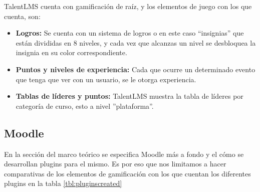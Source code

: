 \begin{multicols*}{2}
    \noindent TalentLMS cuenta con gamificación de raíz,
    y los elementos de juego con los que cuenta, son:
    
    \begin{itemize} 
    
        \item {\bf Logros:} Se cuenta con un sistema de logros o en este caso
        ``insignias'' que están divididas en 8 niveles, y cada vez que alcanzas
        un nivel se desbloquea la insignia en su color correspondiente.
        
        \item {\bf Puntos y niveles de experiencia:} Cada que ocurre un
        determinado evento que tenga que ver con un usuario, se le otorga experiencia.
        
        \item {\bf Tablas de líderes y puntos:} TalentLMS muestra la
        tabla de líderes por categoría de curso, esto a nivel ''plataforma''.
        
    \end{itemize}
    
\end{multicols*}



\clearpage
\subsection{Moodle}
   
En la sección del marco teórico se especifica Moodle más a fondo y el cómo se desarrollan plugins para el mismo. Es por eso que nos limitamos a hacer comparativas de los elementos de gamificación con los que cuentan los diferentes plugins en la tabla \ref{tbl:pluginscreated}

   

 

